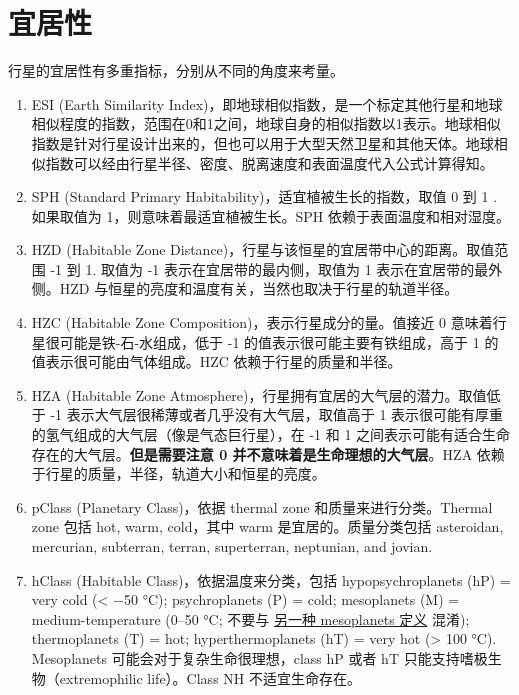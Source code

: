 \documentclass[letterpaper,10pt,english]{sphinxmanual}
\begin{document}
\section{宜居性}
\label{hz::doc}\label{hz:id1}
行星的宜居性有多重指标，分别从不同的角度来考量。
\begin{enumerate}
\item {} 
ESI (Earth Similarity Index)，即地球相似指数，是一个标定其他行星和地球相似程度的指数，范围在0和1之间，地球自身的相似指数以1表示。地球相似指数是针对行星设计出来的，但也可以用于大型天然卫星和其他天体。地球相似指数可以经由行星半径、密度、脱离速度和表面温度代入公式计算得知。

\item {} 
SPH (Standard Primary Habitability)，适宜植被生长的指数，取值 0 到 1 . 如果取值为 1，则意味着最适宜植被生长。SPH 依赖于表面温度和相对湿度。

\item {} 
HZD (Habitable Zone Distance)，行星与该恒星的宜居带中心的距离。取值范围 -1 到 1. 取值为 -1 表示在宜居带的最内侧，取值为 1 表示在宜居带的最外侧。HZD 与恒星的亮度和温度有关，当然也取决于行星的轨道半径。

\item {} 
HZC (Habitable Zone Composition)，表示行星成分的量。值接近 0 意味着行星很可能是铁-石-水组成，低于 -1 的值表示很可能主要有铁组成，高于 1 的值表示很可能由气体组成。HZC 依赖于行星的质量和半径。

\item {} 
HZA (Habitable Zone Atmosphere)，行星拥有宜居的大气层的潜力。取值低于 -1 表示大气层很稀薄或者几乎没有大气层，取值高于 1 表示很可能有厚重的氢气组成的大气层（像是气态巨行星），在 -1 和 1 之间表示可能有适合生命存在的大气层。\textbf{但是需要注意 0 并不意味着是生命理想的大气层}。HZA 依赖于行星的质量，半径，轨道大小和恒星的亮度。

\item {} 
pClass (Planetary Class)，依据 thermal zone 和质量来进行分类。Thermal zone 包括 hot, warm, cold，其中 warm 是宜居的。质量分类包括 asteroidan, mercurian, subterran, terran, superterran, neptunian, and jovian.

\item {} 
hClass (Habitable Class)，依据温度来分类，包括 hypopsychroplanets (hP) = very cold (\textless{} −50 °C); psychroplanets (P) = cold; mesoplanets (M) = medium-temperature (0–50 °C; 不要与 \href{http://en.wikipedia.org/wiki/Mesoplanet}{另一种 mesoplanets 定义} 混淆); thermoplanets (T) = hot; hyperthermoplanets (hT) = very hot (\textgreater{} 100 °C). Mesoplanets 可能会对于复杂生命很理想，class hP 或者 hT 只能支持嗜极生物（extremophilic life）。Class NH 不适宜生命存在。

\end{enumerate}
\end{document}
